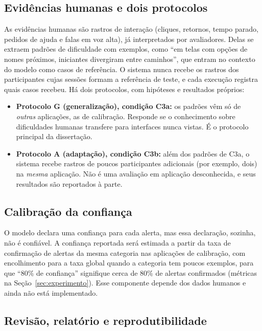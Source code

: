 \documentclass[12pt]{article}
\begin{document}
\subsection{Evidências humanas e dois protocolos}

As evidências humanas são rastros de interação (cliques, retornos, tempo parado, pedidos de ajuda e falas em voz alta), já interpretados por avaliadores. Delas se extraem padrões de dificuldade com exemplos, como ``em telas com opções de nomes próximos, iniciantes divergiram entre caminhos'', que entram no contexto do modelo como casos de referência. O sistema nunca recebe os rastros dos participantes cujas sessões formam a referência de teste, e cada execução registra quais casos recebeu. Há dois protocolos, com hipóteses e resultados próprios:
\begin{itemize}[noitemsep, topsep=3pt, leftmargin=1.5em]
  \item \textbf{Protocolo G (generalização), condição C3a:} os padrões vêm só de \textit{outras} aplicações, as de calibração. Responde se o conhecimento sobre dificuldades humanas transfere para interfaces nunca vistas. É o protocolo principal da dissertação.
  \item \textbf{Protocolo A (adaptação), condição C3b:} além dos padrões de C3a, o sistema recebe rastros de poucos participantes adicionais (por exemplo, dois) na \textit{mesma} aplicação. Não é uma avaliação em aplicação desconhecida, e seus resultados são reportados à parte.
\end{itemize}

\subsection{Calibração da confiança}

O modelo declara uma confiança para cada alerta, mas essa declaração, sozinha, não é confiável. A confiança reportada será estimada a partir da taxa de confirmação de alertas da mesma categoria nas aplicações de calibração, com encolhimento para a taxa global quando a categoria tem poucos exemplos, para que ``80\% de confiança'' signifique cerca de 80\% de alertas confirmados (métricas na Seção~\ref{sec:experimento}). Esse componente depende dos dados humanos e ainda não está implementado.

\subsection{Revisão, relatório e reprodutibilidade}
\end{document}
